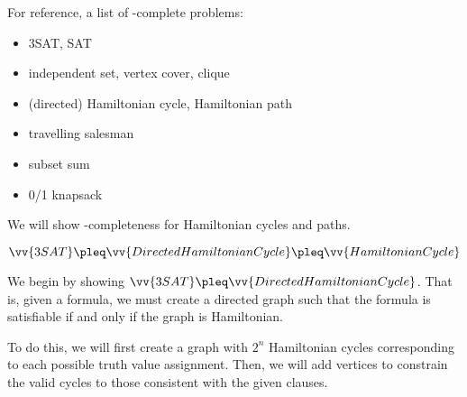For reference, a list of \NP-complete problems:
\begin{itemize}[nosep]
  \item 3SAT, SAT
  \item independent set, vertex cover, clique
  \item (directed) Hamiltonian cycle, Hamiltonian path
  \item travelling salesman
  \item subset sum
  \item 0/1 knapsack
\end{itemize}

We will show \NP-completeness for Hamiltonian cycles and paths.

\begin{theorem}
  $\vv{3SAT} \pleq \vv{DirectedHamiltonianCycle} \pleq \vv{HamiltonianCycle}$
\end{theorem}
\begin{prf}
  We begin by showing $\vv{3SAT} \pleq \vv{DirectedHamiltonianCycle}$.
  That is, given a formula, we must create a directed graph
  such that the formula is satisfiable if and only if the graph is Hamiltonian.

  To do this, we will first create a graph with $2^n$ Hamiltonian cycles
  corresponding to each possible truth value assignment.
  Then, we will add vertices to constrain the valid cycles to those
  consistent with the given clauses.
\end{prf}